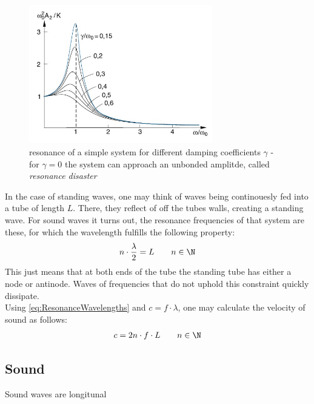 \documentclass{subfiles}
\begin{document}
            \begin{figure}[H]
                \centering
                \includegraphics[width=8cm]{Bilddateien/Grundlagen/Resonanzkurve.jpg}
                \caption{resonance of a simple system for different damping coefficients $\gamma$ - for $\gamma=0$ the system can approach an unbonded amplitde, called \textit{resonance disaster}}
            \end{figure}
            
            In the case of standing waves, one may think of waves being continouesly fed into a tube of length $L$. There, they reflect of off the tubes walls, creating a standing wave. For sound waves it turns out, the resonance frequencies of that system are these, for which the wavelength fulfills the following property:
            \begin{align}
                n\cdot\frac{\lambda}{2}=L\qquad n\in\N
                \label{eq:ResonanceWavelengths}
            \end{align}
            This just means that at both ends of the tube the standing tube has either a node or antinode. Waves of frequencies that do not uphold this constraint quickly dissipate.\\

            \noindent Using \eqref{eq:ResonanceWavelengths} and $c=f\cdot\lambda$, one may calculate the velocity of sound as follows:
            \begin{align*}
                c=2n\cdot f\cdot L\qquad n\in\N
            \end{align*}
            

    \subsection{Sound}
        Sound waves are longitunal
\end{document}
